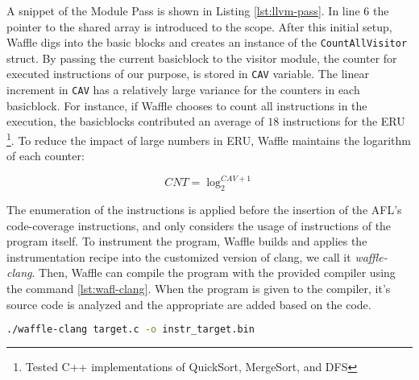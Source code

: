 


A snippet of the Module Pass is shown in Listing \ref{lst:llvm-pass}. In line 6 the pointer to the shared array is introduced to the scope. After this initial setup, Waffle digs into the basic blocks and creates an instance of the \texttt{CountAllVisitor} struct. By passing the current basicblock to the visitor module, the counter for executed instructions of our purpose, is stored in \texttt{CAV} variable. The linear increment in \texttt{CAV} has a relatively large variance for the counters in each basicblock. For instance, if Waffle chooses to count all instructions in the execution, the basicblocks contributed an average of $18$ instructions for the ERU \footnote{Tested C++ implementations of QuickSort, MergeSort, and DFS}. To reduce the impact of large numbers in ERU, Waffle maintains the logarithm of each counter: 

\begin{equation}
  \label{eq:log}
  CNT = \log_{2}^{CAV+1} 
\end{equation}




The enumeration of the instructions is applied before the insertion of the AFL's code-coverage instructions, and only considers the usage of instructions of the program itself. To instrument the program, Waffle builds and applies the instrumentation recipe into the customized version of clang, we call it \textit{waffle-clang}. Then, Waffle can compile the program with the provided compiler using the command \ref{lst:wafl-clang}. When the program is given to the compiler, it's source code is analyzed and the appropriate are added based on the code.

\begin{lstlisting}[language=bash,style=CommandStyle,label={lst:wafl-clang}]
  ./waffle-clang target.c -o instr_target.bin
\end{lstlisting}


